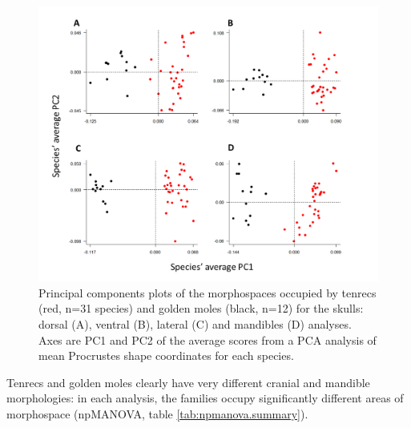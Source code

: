 	\begin{figure}[h]
	\centering
	\includegraphics[width=1\linewidth]{Disparity/writing/figures/FourPlotPCA.png}
	\caption[Principal components plots of the morphospaces occupied by tenrecs and golden moles]
		{Principal components plots of the morphospaces occupied by tenrecs (red, n=31 species) and golden moles (black, n=12) for the skulls: dorsal (A), ventral (B), lateral (C) and mandibles (D) analyses. Axes are PC1 and PC2 of the average scores from a PCA analysis of mean Procrustes shape coordinates for each species. }
	\label{fig:fourPCA}
	\end{figure}

	Tenrecs and golden moles clearly have very different cranial and mandible morphologies: in each analysis, the families occupy significantly different areas of morphospace (npMANOVA, table \ref{tab:npmanova.summary}). 

